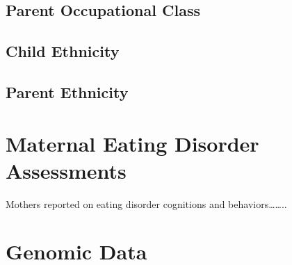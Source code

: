 \documentclass[
]{book}
\begin{document}
\hypertarget{parent-occupational-class}{%
\section{Parent Occupational Class}\label{parent-occupational-class}}

\hypertarget{child-ethnicity}{%
\section{Child Ethnicity}\label{child-ethnicity}}

\hypertarget{parent-ethnicity}{%
\section{Parent Ethnicity}\label{parent-ethnicity}}

\hypertarget{maternal-eating-disorder-assessments}{%
\chapter{Maternal Eating Disorder Assessments}\label{maternal-eating-disorder-assessments}}

Mothers reported on eating disorder cognitions and behaviors\ldots\ldots..

\hypertarget{genomic-data}{%
\chapter{Genomic Data}\label{genomic-data}}

  
\end{document}

